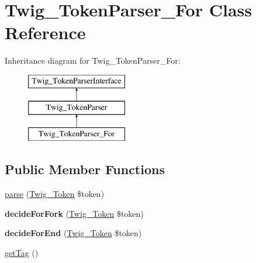 \hypertarget{class_twig___token_parser___for}{}\section{Twig\+\_\+\+Token\+Parser\+\_\+\+For Class Reference}
\label{class_twig___token_parser___for}
Inheritance diagram for Twig\+\_\+\+Token\+Parser\+\_\+\+For\+:\begin{figure}[H]
\begin{center}
\leavevmode
\includegraphics[height=3.000000cm]{class_twig___token_parser___for}
\end{center}
\end{figure}
\subsection*{Public Member Functions}
\begin{DoxyCompactItemize}
\item 
\hyperlink{class_twig___token_parser___for_a5dfa2e269321584fb74e8b43dabe0efd}{parse} (\hyperlink{class_twig___token}{Twig\+\_\+\+Token} \$token)
\item 
\hypertarget{class_twig___token_parser___for_a53cc6e3346ab6c7b7afd287b1353b4e5}{}{\bfseries decide\+For\+Fork} (\hyperlink{class_twig___token}{Twig\+\_\+\+Token} \$token)\label{class_twig___token_parser___for_a53cc6e3346ab6c7b7afd287b1353b4e5}

\item 
\hypertarget{class_twig___token_parser___for_a812ad30964fe8ea7ce0e972526ec4f7f}{}{\bfseries decide\+For\+End} (\hyperlink{class_twig___token}{Twig\+\_\+\+Token} \$token)\label{class_twig___token_parser___for_a812ad30964fe8ea7ce0e972526ec4f7f}

\item 
\hyperlink{class_twig___token_parser___for_ab86ba36154b20e6bbfa3ba705f12f9d6}{get\+Tag} ()
\end{DoxyCompactItemize}
